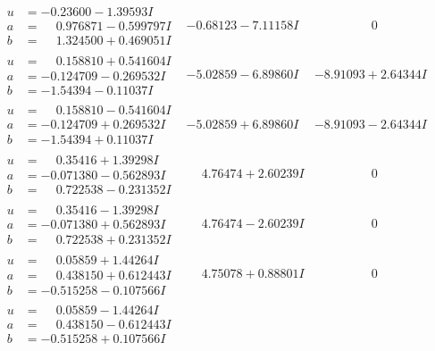 \documentclass[1p]{elsarticle_modified}
\theoremstyle{definition}
\begin{document}
$$\begin{array}{c|c|c}
\begin{aligned}
u &= -0.23600 - 1.39593 I \\
a &= \phantom{-}0.976871 - 0.599797 I \\
b &= \phantom{-}1.324500 + 0.469051 I\end{aligned}
 & -0.68123 - 7.11158 I & \phantom{-0.000000 } 0 \\ \hline\begin{aligned}
u &= \phantom{-}0.158810 + 0.541604 I \\
a &= -0.124709 - 0.269532 I \\
b &= -1.54394 - 0.11037 I\end{aligned}
 & -5.02859 - 6.89860 I & -8.91093 + 2.64344 I \\ \hline\begin{aligned}
u &= \phantom{-}0.158810 - 0.541604 I \\
a &= -0.124709 + 0.269532 I \\
b &= -1.54394 + 0.11037 I\end{aligned}
 & -5.02859 + 6.89860 I & -8.91093 - 2.64344 I \\ \hline\begin{aligned}
u &= \phantom{-}0.35416 + 1.39298 I \\
a &= -0.071380 - 0.562893 I \\
b &= \phantom{-}0.722538 - 0.231352 I\end{aligned}
 & \phantom{-}4.76474 + 2.60239 I & \phantom{-0.000000 } 0 \\ \hline\begin{aligned}
u &= \phantom{-}0.35416 - 1.39298 I \\
a &= -0.071380 + 0.562893 I \\
b &= \phantom{-}0.722538 + 0.231352 I\end{aligned}
 & \phantom{-}4.76474 - 2.60239 I & \phantom{-0.000000 } 0 \\ \hline\begin{aligned}
u &= \phantom{-}0.05859 + 1.44264 I \\
a &= \phantom{-}0.438150 + 0.612443 I \\
b &= -0.515258 - 0.107566 I\end{aligned}
 & \phantom{-}4.75078 + 0.88801 I & \phantom{-0.000000 } 0 \\ \hline\begin{aligned}
u &= \phantom{-}0.05859 - 1.44264 I \\
a &= \phantom{-}0.438150 - 0.612443 I \\
b &= -0.515258 + 0.107566 I\end{aligned}

\end{array}$$
\end{document}
